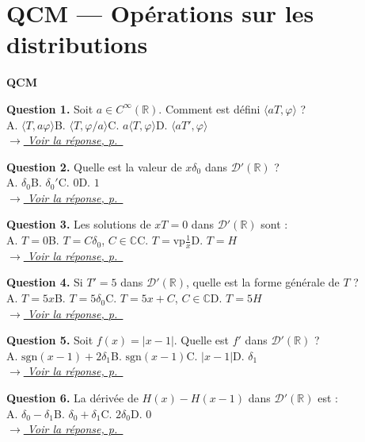 \documentclass[12pt,a4paper,openany]{book}
\theoremstyle{definition}
\theoremstyle{plain}
\theoremstyle{remark}
\newenvironment{qcmblock}{%
	\begin{mdframed}[linewidth=0.5pt, linecolor=black!35,
		backgroundcolor=gray!5,
		skipabove=12pt, skipbelow=12pt,
		innerleftmargin=12pt, innerrightmargin=8pt,
		innertopmargin=8pt, innerbottommargin=8pt]%
		\noindent\textbf{\scshape QCM}\par\smallskip%
	}{%
	\end{mdframed}%
}
\newcommand{\navtoQCMRep}[2]{%
	\vspace{2pt}%
	\noindent\hfill{\small\itshape%
		\hyperlink{qcmrep:#1:q#2}{$\rightarrow$ Voir la réponse, p.~\pageref*{qcmrep:#1:q#2}}%
	}%
	\vspace{6pt}%
}
\begin{document}
	\section{QCM — Opérations sur les distributions}
	
	\begin{qcmblock}
		\hypertarget{qcm:ch5:start}{}\label{qcm:ch5:start}
		\hypertarget{qcm:ch5:q1}{}\label{qcm:ch5:q1}
		\textbf{Question 1.} Soit $a \in C^\infty(\mathbb{R})$. Comment est défini $\langle aT, \varphi \rangle$ ?\\
		A. $\langle T, a\varphi \rangle$\quad B. $\langle T, \varphi/a \rangle$\quad C. $a\langle T, \varphi \rangle$\quad D. $\langle aT', \varphi \rangle$\\
		\navtoQCMRep{ch5}{1}
		
		\medskip
		\hypertarget{qcm:ch5:q2}{}\label{qcm:ch5:q2}
		\textbf{Question 2.} Quelle est la valeur de $x\delta_0$ dans $\mathcal{D}'(\mathbb{R})$ ?\\
		A. $\delta_0$\quad B. $\delta_0'$\quad C. $0$\quad D. $1$\\
		\navtoQCMRep{ch5}{2}
		
		\medskip
		\hypertarget{qcm:ch5:q3}{}\label{qcm:ch5:q3}
		\textbf{Question 3.} Les solutions de $xT = 0$ dans $\mathcal{D}'(\mathbb{R})$ sont :\\
		A. $T = 0$\quad B. $T = C\delta_0$, $C \in \mathbb{C}$\quad C. $T = \mathrm{vp}\frac{1}{x}$\quad D. $T = H$\\
		\navtoQCMRep{ch5}{3}
		
		\medskip
		\hypertarget{qcm:ch5:q4}{}\label{qcm:ch5:q4}
		\textbf{Question 4.} Si $T' = 5$ dans $\mathcal{D}'(\mathbb{R})$, quelle est la forme générale de $T$ ?\\
		A. $T = 5x$\quad B. $T = 5\delta_0$\quad C. $T = 5x + C$, $C \in \mathbb{C}$\quad D. $T = 5H$\\
		\navtoQCMRep{ch5}{4}
		
		\medskip
		\hypertarget{qcm:ch5:q5}{}\label{qcm:ch5:q5}
		\textbf{Question 5.} Soit $f(x) = |x-1|$. Quelle est $f'$ dans $\mathcal{D}'(\mathbb{R})$ ?\\
		A. $\mathrm{sgn}(x-1) + 2\delta_1$\quad B. $\mathrm{sgn}(x-1)$\quad C. $|x-1|$\quad D. $\delta_1$\\
		\navtoQCMRep{ch5}{5}
		
		\medskip
		\hypertarget{qcm:ch5:q6}{}\label{qcm:ch5:q6}
		\textbf{Question 6.} La dérivée de $H(x) - H(x-1)$ dans $\mathcal{D}'(\mathbb{R})$ est :\\
		A. $\delta_0 - \delta_1$\quad B. $\delta_0 + \delta_1$\quad C. $2\delta_0$\quad D. $0$\\
		\navtoQCMRep{ch5}{6}
		

\end{qcmblock}
\end{document}
